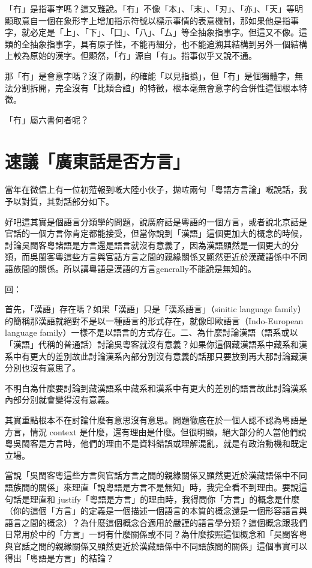 \documentclass[a5paper, 10pt, openany]{book} %
\begin{document}
「冇」是指事字嗎？這又難說。「冇」不像「本」、「末」、「刃」、「亦」、「天」等明顯取意自一個在象形字上增加指示符號以標示事情的表意機制，那如果他是指事字，就必定是「上」、「下」、「囗」、「八」、「厶」等全抽象指事字。但這又不像。這類的全抽象指事字，具有原子性，不能再細分，也不能追溯其結構到另外一個結構上較為原始的漢字。但顯然，「冇」源自「有」。指事似乎又說不通。

那「冇」是會意字嗎？沒了兩劃，的確能「以見指撝」，但「冇」是個獨體字，無法分割拆開，完全沒有「比類合誼」的特徵，根本毫無會意字的合併性這個根本特徵。

「冇」屬六書何者呢？

\chapter{速議「廣東話是否方言」}
當年在微信上有一位初蒞報到嘅大陸小伙子，拋咗兩句「粵語方言論」嘅說話，我予以對質，其對話部分如下。

好吧這其實是個語言分類學的問題，說廣府話是粵語的一個方言，或者說北京話是官話的一個方言你肯定都能接受，但當你說到「漢語」這個更加大的概念的時候，討論吳閩客粵諸語是方言還是語言就沒有意義了，因為漢語顯然是一個更大的分類，而吳閩客粵這些方言與官話方言之間的親緣關係又顯然更近於漢藏語係中不同語族間的關係。所以講粵語是漢語的方言generally不能說是無知的。

回：

首先，「漢語」存在嗎？如果「漢語」只是「漢系語言」（sinitic language family）的簡稱那漢語就絕對不是以一種語言的形式存在，就像印歐語言（Indo-European language family）一樣不是以語言的方式存在。二、為什麼討論漢語（語系或以「漢語」代稱的普通話）討論吳粵客就沒有意義？如果你這個藏漢語系中藏系和漢系中有更大的差別故此討論漢系內部分別沒有意義的話那只要放到再大那討論藏漢分別也沒有意思了。

不明白為什麼要討論到藏漢語系中藏系和漢系中有更大的差別的語言故此討論漢系內部分別就會變得沒有意義。

其實重點根本不在討論什麼有意思沒有意思。問題徹底在於一個人認不認為粵語是方言，情況 context 是什麼，還有理由是什麼。但很明顯，絕大部分的人當他們說粵吳閩客是方言時，他們的理由不是資料錯誤或理解混亂，就是有政治動機和既定立場。

當說「吳閩客粵這些方言與官話方言之間的親緣關係又顯然更近於漢藏語係中不同語族間的關係」來理直「說粵語是方言不是無知」時，我完全看不到理由。要說這句話是理直和 justify「粵語是方言」的理由時，我得問你「方言」的概念是什麼（你的這個「方言」的定義是一個描述一個語言的本質的概念還是一個形容語言與語言之間的概念）？為什麼這個概念合適用於嚴謹的語言學分類？這個概念跟我們日常用於中的「方言」一詞有什麼關係或不同？為什麼按照這個概念和「吳閩客粵與官話之間的親緣關係又顯然更近於漢藏語係中不同語族間的關係」這個事實可以得出「粵語是方言」的結論？
\end{document}
